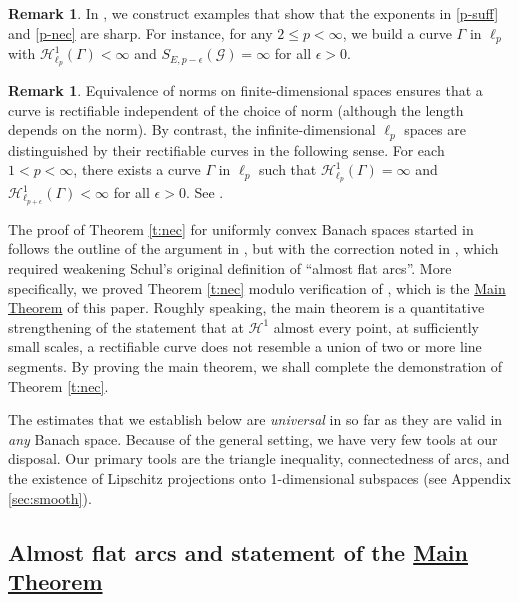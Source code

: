 \documentclass[12pt]{amsart}
\numberwithin{equation}{section}
\theoremstyle{plain}
\theoremstyle{definition}
\newtheorem{remark}[theorem]{Remark}
\newcommand{\Haus}{\mathcal{H}}
\numberwithin{figure}{section}
\begin{document}
\begin{remark} In \cite[\S5]{Badger-McCurdy-1}, we construct examples that show that the exponents in \eqref{p-suff} and \eqref{p-nec} are sharp. For instance, for any $2\leq p<\infty$, we build a curve $\Gamma$ in $\ell_p$ with $\Haus^1_{\ell_p}(\Gamma)<\infty$ and $S_{E,p-\epsilon}(\mathscr{G})=\infty$ for all $\epsilon>0$.\end{remark}

\begin{remark} Equivalence of norms on finite-dimensional spaces ensures that a curve is rectifiable independent of the choice of norm (although the length depends on the norm). By contrast, the infinite-dimensional $\ell_p$ spaces are distinguished by their rectifiable curves in the following sense. For each $1<p<\infty$, there exists a curve $\Gamma$ in $\ell_p$ such that $\Haus^1_{\ell_p}(\Gamma)=\infty$ and $\Haus^1_{\ell_{p+\epsilon}}(\Gamma)<\infty$ for all $\epsilon>0$. See \cite[Proposition 1.1]{Badger-McCurdy-1}.\end{remark}

The proof of Theorem \ref{t:nec} for uniformly convex Banach spaces started in \cite[\S3]{Badger-McCurdy-1} follows the outline of the argument in \cite{Schul-Hilbert}, but with the correction noted in \cite[Remark 3.24]{Badger-McCurdy-1}, which required weakening Schul's original definition of ``almost flat arcs''. More specifically, we proved Theorem \ref{t:nec} modulo verification of \cite[Theorem 3.30]{Badger-McCurdy-1}, which is the \hyperref[t:main]{Main Theorem} of this paper. Roughly speaking, the main theorem is a quantitative strengthening of the statement that at $\Haus^1$ almost every point, at sufficiently small scales, a rectifiable curve does not resemble a union of two or more line segments. By proving the main theorem, we shall complete the demonstration of Theorem \ref{t:nec}.

The estimates that we establish below are \emph{universal} in so far as they are valid in \emph{any} Banach space. Because of the general setting, we have very few tools at our disposal. Our primary tools are the triangle inequality, connectedness of arcs, and the existence of Lipschitz projections onto 1-dimensional subspaces (see Appendix \ref{sec:smooth}).

\subsection{Almost flat arcs and statement of the \texorpdfstring{\hyperref[t:main]{Main Theorem}}{Main Theorem}} \label{sec:main}
\end{document}
